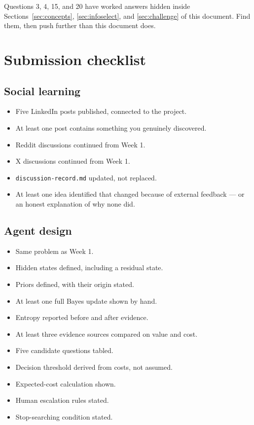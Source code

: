\documentclass[11pt,a4paper]{article}
\begin{document}
Questions 3, 4, 15, and 20 have worked answers hidden inside Sections~\ref{sec:concepts},
\ref{sec:infoselect}, and \ref{sec:challenge} of this document. Find them, then push further than
this document does.

\section{Submission checklist}

\subsection*{Social learning}
\begin{itemize}[label=$\square$]
\item Five LinkedIn posts published, connected to the project.
\item At least one post contains something you genuinely discovered.
\item Reddit discussions continued from Week 1.
\item X discussions continued from Week 1.
\item \texttt{discussion-record.md} updated, not replaced.
\item At least one idea identified that changed because of external feedback --- or an honest
      explanation of why none did.
\end{itemize}

\subsection*{Agent design}
\begin{itemize}[label=$\square$]
\item Same problem as Week 1.
\item Hidden states defined, including a residual state.
\item Priors defined, with their origin stated.
\item At least one full Bayes update shown by hand.
\item Entropy reported before and after evidence.
\item At least three evidence sources compared on value and cost.
\item Five candidate questions tabled.
\item Decision threshold derived from costs, not assumed.
\item Expected-cost calculation shown.
\item Human escalation rules stated.
\item Stop-searching condition stated.
\end{itemize}
\end{document}
